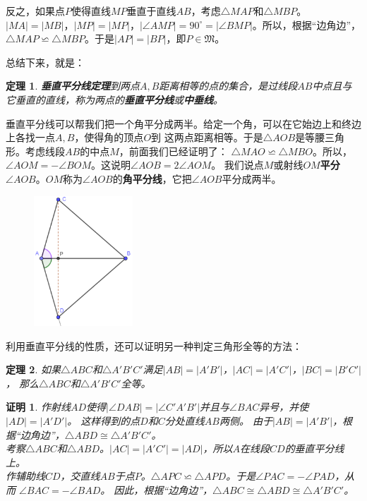 \documentclass[12pt,UTF8]{ctexbook}
\newtheorem{tm}{定理}[section]
\newtheorem*{proof2}{证明}
\begin{document}
反之，如果点$P$使得直线$MP$垂直于直线$AB$，考虑$\triangle MAP$和$\triangle MBP$。
$|MA| = |MB|$，$|MP| = |MP|$，$|\angle AMP| = 90^\circ = |\angle BMP|$。所以，根据“边角边”，
$\triangle MAP \backsimeq \triangle MBP$。于是$|AP| = |BP|$，即$P\in\mathfrak{M}$。

总结下来，就是：
\begin{tm}{\textbf{垂直平分线定理}}\label{tm:3-0-2}
    到两点$A,B$距离相等的点的集合，是过线段$AB$中点且与它垂直的直线，称为两点的\textbf{垂直平分线}或\textbf{中垂线}。
\end{tm}

垂直平分线可以帮我们把一个角平分成两半。给定一个角，可以在它始边上和终边上各找一点$A,B$，使得角的顶点$O$到
这两点距离相等。于是$\triangle AOB$是等腰三角形。考虑线段$AB$的中点$M$，前面我们已经证明了：
$\triangle MAO \backsimeq \triangle MBO$。所以，$\angle AOM = -\angle BOM$。这说明$\angle AOB = 2\angle AOM$。
我们说点$M$或射线$OM$\textbf{平分}$\angle AOB$。$OM$称为$\angle AOB$的\textbf{角平分线}，它把$\angle AOB$平分成两半。


\begin{figure} %
    \vspace{-15pt}
    \centering
    \includegraphics[width=0.33\textwidth]{三角形4.png}
\end{figure}

利用垂直平分线的性质，还可以证明另一种判定三角形全等的方法：
\begin{tm}\label{tm:3-0-4}
    如果$\triangle ABC$和$\triangle A'B'C'$满足$|AB| = |A'B'|$，$|AC| = |A'C'|$，$|BC| = |B'C'|$，
    那么$\triangle ABC$和$\triangle A'B'C'$全等。
\end{tm}
\begin{proof2}
    作射线$AD$使得$|\angle DAB| = |\angle C'A'B'|$并且与$\angle BAC$异号，并使$|AD| = |A'D'|$。
    这样得到的点$D$和$C$分处直线$AB$两侧。
    由于$|AB| = |A'B'|$，根据“边角边”，$\triangle ABD \cong \triangle A'B'C'$。\\
    考察$\triangle ABC$和$\triangle ABD$。$|AC| = |A'C'| = |AD|$，所以$A$在线段$CD$的垂直平分线上。\\
    作辅助线$CD$，交直线$AB$于点$P$。$\triangle APC \backsimeq \triangle APD$。于是$\angle PAC = -\angle PAD$，从而
    $\angle BAC = -\angle BAD$。
    因此，根据“边角边”，$\triangle ABC \cong \triangle ABD \cong \triangle A'B'C'$。
\end{proof2}
\end{document}
